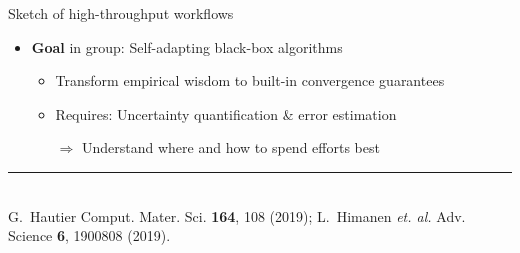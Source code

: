 \begin{frame}{Sketch of high-throughput workflows}
\begin{itemize}
\begin{itemize}
            \end{itemize}
        \vspace{0.2em}
        \item \textbf{Goal} in \matmat group: \alert{Self-adapting black-box algorithms}
            \begin{itemize}
                \vspace{-0.4em}
                \item Transform \alert{empirical wisdom} to built-in \alert{convergence guarantees}
                \vspace{-0.4em}
                \item Requires: Uncertainty quantification \& error estimation
                \vspace{-0.4em}
                \item[$\Rightarrow$] Understand \alert{where and how} to spend efforts best
            \end{itemize}
   \end{itemize}
   \vspace{-0.8em}
   \rule{4.5cm}{0.5pt}\\[-0.5em]
   {\tiny G.~Hautier Comput. Mater. Sci. \textbf{164}, 108 (2019);
       L.~Himanen \textit{et. al.} Adv. Science \textbf{6}, 1900808 (2019).}
\end{frame}

